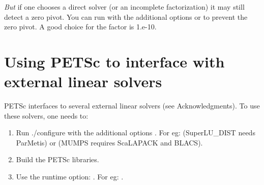 \emph{But} if one chooses a direct solver (or an incomplete factorization)
it may still detect a zero pivot. 
You can run with the additional options  
 or   to 
prevent the zero pivot. A good choice for the  factor is 1.e-10.

\section{Using PETSc to interface with external linear solvers}
\label{sec_externalsol}

PETSc interfaces to several external linear solvers (see Acknowledgments).
To use these solvers, one needs to:

\begin{enumerate}
\item Run ./configure with the additional options . 
For eg:   (SuperLU\_DIST needs ParMetis) or
   (MUMPS requires  ScaLAPACK and BLACS).
\item Build the PETSc libraries.
\item Use the runtime option:  
.
For eg:   .
\end{enumerate}

